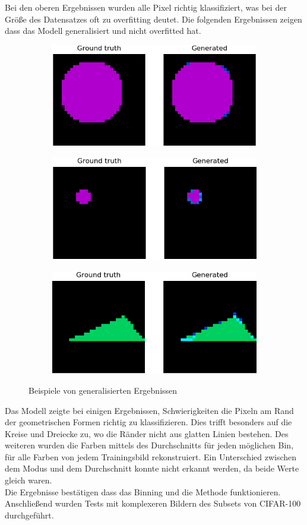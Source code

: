 Bei den oberen Ergebnissen wurden alle Pixel richtig klassifiziert, was bei der Größe des Datensatzes oft zu \gls{overfitting} deutet.
Die folgenden Ergebnissen zeigen dass das Modell generalisiert und nicht overfitted hat.

\begin{figure}[H]
  \vspace{1cm}
  \begin{subfigure}
    \centering
    \includegraphics[width=.32\textwidth]{resources/experiments/581.png}
  \end{subfigure}
  \begin{subfigure}
    \centering
    \includegraphics[width=.32\textwidth]{resources/experiments/712.png}
  \end{subfigure}
  \begin{subfigure}
    \centering
    \includegraphics[width=.32\textwidth]{resources/experiments/761.png}
  \end{subfigure}
  \caption{Beispiele von generalisierten Ergebnissen}
  \label{image:nicht-gute-ergebnisse-toy-dataset}
\end{figure}

Das Modell zeigte bei einigen Ergebnissen, Schwierigkeiten die Pixeln am Rand der geometrischen Formen richtig zu klassifizieren.
Dies trifft besonders auf die Kreise und Dreiecke zu, wo die Ränder nicht aus glatten Linien bestehen. Des weiteren wurden die Farben mittels
des Durchschnitts für jeden möglichen Bin, für alle Farben von jedem Trainingsbild rekonstruiert. Ein Unterschied zwischen dem Modus und dem 
Durchschnitt konnte nicht erkannt werden, da beide Werte gleich waren.
\\
Die Ergebnisse bestätigen dass das Binning und die Methode funktionieren. Anschließend wurden Tests mit komplexeren Bildern
des Subsets von CIFAR-100 durchgeführt.

